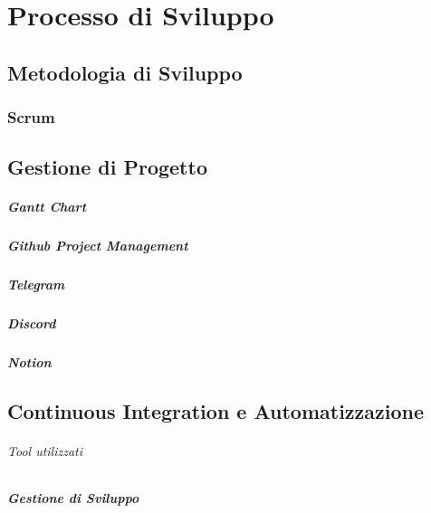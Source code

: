 \chapter{Processo di Sviluppo}
 
\section{Metodologia di Sviluppo}

\subsection{Scrum}

\section{Gestione di Progetto}

\paragraph{Gantt Chart}

\paragraph{Github Project Management}

\paragraph{Telegram}

\paragraph{Discord}

\paragraph{Notion}

\section{Continuous Integration e Automatizzazione}

\subparagraph{Tool utilizzati}

\paragraph{Gestione di Sviluppo}










